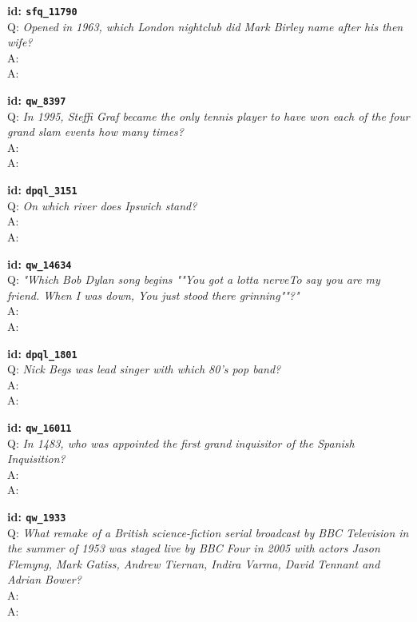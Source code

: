 \tiny{\setlength{\parindent}{0cm}
\textbf{id: \texttt{sfq\_11790}} \\
Q: \textit{Opened in 1963, which London nightclub did Mark Birley name after his then wife?} \\
A:  \\
A: }

\tiny{\setlength{\parindent}{0cm}
\textbf{id: \texttt{qw\_8397}} \\
Q: \textit{In 1995, Steffi Graf became the only tennis player to have won each of the four grand slam events how many times?} \\
A:  \\
A: }

\tiny{\setlength{\parindent}{0cm}
\textbf{id: \texttt{dpql\_3151}} \\
Q: \textit{On which river does Ipswich stand?} \\
A:  \\
A: }

\tiny{\setlength{\parindent}{0cm}
\textbf{id: \texttt{qw\_14634}} \\
Q: \textit{"Which Bob Dylan song begins ""You got a lotta nerveTo say you are my friend. When I was down, You just stood there grinning""?"} \\
A:  \\
A: }

\tiny{\setlength{\parindent}{0cm}
\textbf{id: \texttt{dpql\_1801}} \\
Q: \textit{Nick Begs was lead singer with which 80’s pop band?} \\
A:  \\
A: }

\tiny{\setlength{\parindent}{0cm}
\textbf{id: \texttt{qw\_16011}} \\
Q: \textit{In 1483, who was appointed the first grand inquisitor of the Spanish Inquisition?} \\
A:  \\
A: }

\tiny{\setlength{\parindent}{0cm}
\textbf{id: \texttt{qw\_1933}} \\
Q: \textit{What remake of a British science-fiction serial broadcast by BBC Television in the summer of 1953 was staged live by BBC Four in 2005 with actors Jason Flemyng, Mark Gatiss, Andrew Tiernan, Indira Varma, David Tennant and Adrian Bower?} \\
A:  \\
A: }

